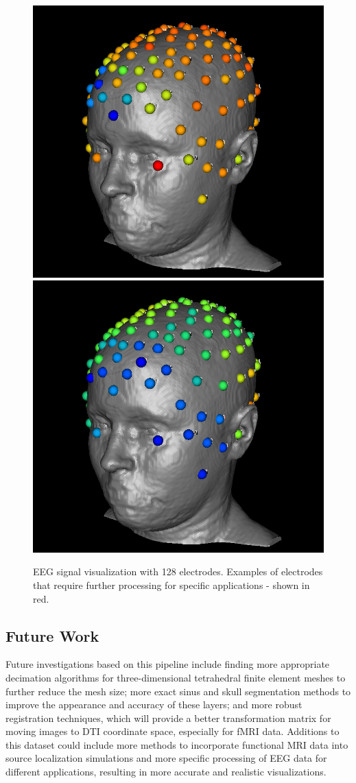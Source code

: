 \begin{figure}[H]
\begin{center}
\includegraphics[width=.49\textwidth]{Figures/128_eeg_1}
\includegraphics[width=.49\textwidth]{Figures/128_eeg_2}
\caption{EEG signal visualization with 128 electrodes. Examples of electrodes that require further processing for specific applications - shown in red.}
\label{fig:eegvis}
\end{center}
\end{figure}

\subsection{Future Work}

Future investigations based on this pipeline include finding more appropriate decimation algorithms for three-dimensional tetrahedral finite element meshes to further reduce the mesh size; more exact sinus and skull segmentation methods to improve the appearance and accuracy of these layers; and more robust registration techniques, which will provide a better transformation matrix for moving images to DTI coordinate space, especially for fMRI data. Additions to this dataset could include more methods to incorporate functional MRI data into source localization simulations and more specific processing of EEG data for different applications, resulting in more accurate and realistic visualizations. 


